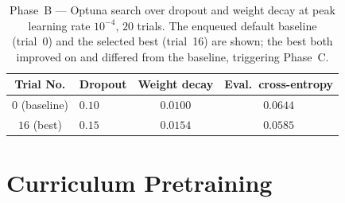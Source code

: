 \documentclass[titlepage,a4paper,11pt]{report}
\begin{document}
    \begin{table}[ht]
        \centering
        \caption{Phase~B --- Optuna search over dropout and weight decay at peak learning rate $10^{-4}$, $20$ trials. The enqueued default baseline (trial~0) and the selected best (trial~16) are shown; the best both improved on and differed from the baseline, triggering Phase~C.}
        \label{tab:hpo_phase_b}
        \begin{tabular}{clcc}
            \toprule
            Trial No. & Dropout & Weight decay & Eval.\ cross-entropy \\
            \midrule
            $0$ (baseline) & $0.10$ & $0.0100$ & $0.0644$ \\
            $16$ (best)    & $0.15$ & $0.0154$ & $\mathbf{0.0585}$ \\
            \bottomrule
        \end{tabular}
    \end{table}

    \section{Curriculum Pretraining}
    
\end{document}
